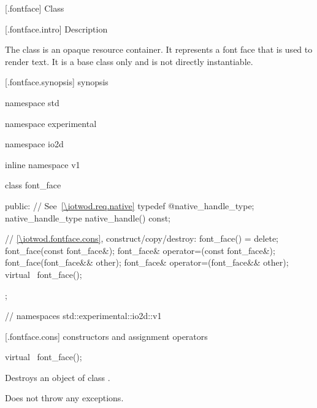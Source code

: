  [\iotwod.fontface] {Class }

 [\iotwod.fontface.intro] { Description}

\pnum
{}%
The  class is an opaque resource container. It represents a 
font face that is used to render text. It is a base class only and is not 
directly instantiable.

 [\iotwod.fontface.synopsis] { synopsis}

\begin{codeblock}
namespace std { namespace experimental { namespace io2d { inline namespace v1 {
  class font_face {
  public:
    // See~\ref{\iotwod.req.native}
    typedef @\impdef@ native_handle_type;
    native_handle_type native_handle() const;

    // \ref{\iotwod.fontface.cons}, construct/copy/destroy:
    font_face() = delete;
    font_face(const font_face&);
    font_face& operator=(const font_face&);
    font_face(font_face&& other);
    font_face& operator=(font_face&& other);
    virtual ~font_face();
  };
} } } } // namespaces std::experimental::io2d::v1
\end{codeblock}

 [\iotwod.fontface.cons] {\tcode{} constructors and 
assignment operators}

%
\begin{itemdecl}
virtual ~font_face();
\end{itemdecl}
\begin{itemdescr}
	\pnum
	\effects
	Destroys an object of class .
	
	\pnum
	\remarks
	Does not throw any exceptions.
\end{itemdescr}
